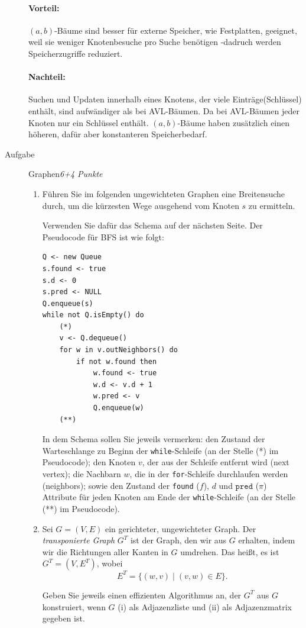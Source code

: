 \documentclass[a4paper,twoside,12pt]{article}
\newcounter{AUFGNR}
\newcommand{\AUFGABE}[2]{\vspace{0.3cm}\item[Aufgabe \arabic{AUFGNR}]\stepcounter{AUFGNR} #1\hfill\emph{#2}}
\begin{document}
\begin{description}
\paragraph{Vorteil:} $(a,b)$-Bäume sind besser für externe Speicher, wie Festplatten, geeignet, weil sie weniger Knotenbesuche pro Suche benötigen -dadruch werden Speicherzugriffe reduziert.
\paragraph{Nachteil:} Suchen und Updaten innerhalb eines Knotens, der viele Einträge(Schlüssel) enthält, sind aufwändiger als bei AVL-Bäumen. Da bei AVL-Bäumen jeder Knoten nur ein Schlüssel enthält. $(a,b)$-Bäume haben zusätzlich einen höheren, dafür aber konstanteren Speicherbedarf.

\newpage
\AUFGABE{Graphen}{6+4 Punkte}

\begin{enumerate}
  \item Führen Sie im folgenden ungewichteten Graphen eine Breitensuche durch, um die kürzesten
	 Wege  ausgehend vom Knoten $s$ zu ermitteln. 

		Verwenden Sie dafür das Schema auf der nächsten Seite. Der Pseudocode für BFS ist 
		wie folgt:
		\begin{verbatim}
Q <- new Queue
s.found <- true
s.d <- 0       
s.pred <- NULL 
Q.enqueue(s)
while not Q.isEmpty() do
    (*)
    v <- Q.dequeue()
    for w in v.outNeighbors() do
        if not w.found then
            w.found <- true
            w.d <- v.d + 1  
            w.pred <- v     
            Q.enqueue(w)
    (**)
\end{verbatim}
In dem Schema sollen Sie jeweils vermerken: den Zustand der Warteschlange zu Beginn der
		\texttt{while}-Schleife (an der Stelle (*) im Pseudocode); 
		den Knoten $v$, der aus der Schleife entfernt wird
		(next vertex); die Nachbarn $w$, die in der \texttt{for}-Schleife durchlaufen werden
		(neighbors); sowie den Zustand der \texttt{found} ($f$), $d$ und 
		$\texttt{pred}$ ($\pi$) Attribute für jeden Knoten am Ende der \texttt{while}-Schleife
		(an der Stelle (**) im Pseudocode).
  \item
	  Sei $G = (V, E)$ ein gerichteter, ungewichteter Graph.
		Der \emph{transponierte Graph} $G^T$ ist der Graph, den wir aus $G$
		erhalten, indem wir die Richtungen aller Kanten in $G$ umdrehen. Das heißt,
		es ist $G^T = (V, E^T)$, wobei
		\[
			E^T = \{(w, v) \mid (v, w) \in E\}.
		\]
		
		Geben Sie jeweils einen effizienten Algorithmus an, der $G^T$ aus $G$ konstruiert,
		wenn $G$ (i) als Adjazenzliste und (ii) als Adjazenzmatrix gegeben ist.


\end{enumerate}
\end{description}
\end{document}
